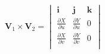 $\mathbf{V}_1 \times \mathbf{V}_2 =   \begin{vmatrix} \mathbf{i} & \mathbf{j} & \mathbf{k} \\    \frac{\partial X}{\partial u} & \frac{\partial Y}{\partial u} & 0 \\    \frac{\partial X}{\partial v} & \frac{\partial Y}{\partial v} & 0 \\   \end{vmatrix}$